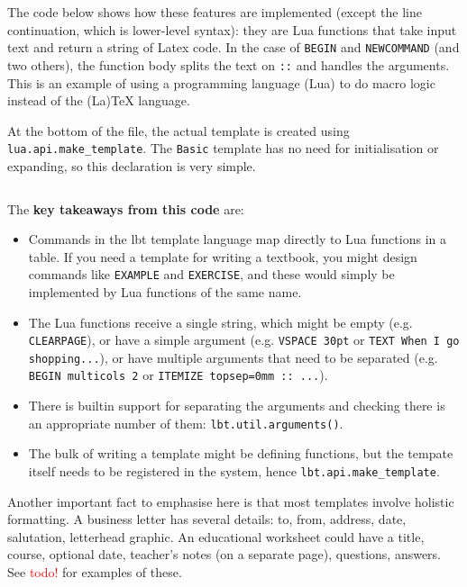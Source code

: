 \documentclass[11pt]{article}
\newcommand{\lbtlabel}{\textsf{lbt}}
\begin{document}
The code below shows how these features are implemented (except the line continuation, which is lower-level syntax): they are Lua functions that take input text and return a string of Latex code. In the case of \texttt{BEGIN} and \texttt{NEWCOMMAND} (and two others), the function body splits the text on \texttt{::} and handles the arguments. This is an example of using a programming language (Lua) to do macro logic instead of the (La)TeX language.

At the bottom of the file, the actual template is created using \texttt{lua.api.make\_template}. The \texttt{Basic} template has no need for initialisation or expanding, so this declaration is very simple.

\inputminted{lua}{media/impl-lbt-6-builtin-templates.lua}

The \textbf{key takeaways from this code} are:
\begin{itemize}
  \item Commands in the \lbtlabel{} template language map directly to Lua functions in a table. If you need a template for writing a textbook, you might design commands like \texttt{EXAMPLE} and \texttt{EXERCISE}, and these would simply be implemented by Lua functions of the same name.
  \item The Lua functions receive a single string, which might be empty (e.g. \texttt{CLEARPAGE}), or have a simple argument (e.g. \texttt{VSPACE 30pt} or \texttt{TEXT When I go shopping...}), or have multiple arguments that need to be separated (e.g. \texttt{BEGIN multicols 2} or \texttt{ITEMIZE topsep=0mm :: ...}).
  \item There is builtin support for separating the arguments and checking there is an appropriate number of them: \texttt{lbt.util.arguments()}.
  \item The bulk of writing a template might be defining functions, but the tempate itself needs to be registered in the system, hence \texttt{lbt.api.make\_template}.
\end{itemize}

Another important fact to emphasise here is that most templates involve holistic formatting. A business letter has several details: to, from, address, date, salutation, letterhead graphic. An educational worksheet could have a title, course, optional date, teacher's notes (on a separate page), questions, answers. See \textcolor{red}{todo!} for examples of these.

\end{document}
